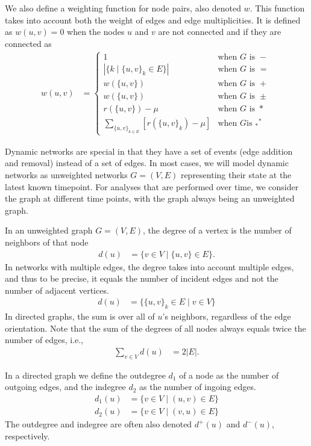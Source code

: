 \documentclass{article}
\begin{document}
We also define a weighting function for node pairs, also denoted
$w$. This function takes into account both the weight of edges and edge
multiplicities. It is defined as $w(u,v)=0$ when the nodes $u$ and $v$ are
not connected and if they are connected as
\begin{align}
  w(u,v) &= \left\{ \begin{array}{ll}
    1 & \text{when $G$ is $-$} \\
    |\{k \mid \{u,v\}_k \in E\}| & \text{when $G$ is $=$} \\
    w(\{u,v\}) & \text{when $G$ is $+$}
    \\
    w(\{u,v\}) & \text{when $G$ is $\pm$} \\
    r(\{u,v\}) - \mu & \text{when $G$ is $*$} \\
    \sum_{\{u,v\}_{k\in E}} [r(\{u,v\}_k) - \mu] & \text{when $G$
      is $_*{}^*$}
    \end{array} \right. 
\end{align}

Dynamic networks are special in that they have a set of events (edge
addition and removal) instead of a set of edges.  In most cases, we will
model dynamic networks as unweighted networks $G=(V,E)$ representing
their state at the latest known timepoint.  For analyses that are
performed over time, we consider the graph at different time points,
with the graph always being an unweighted graph. 

In an unweighted graph $G=(V,E)$, the degree of a vertex is the number
of neighbors of that node
\begin{align}
  d(u) &= \{ v \in V \mid \{u,v\} \in E \}. 
\end{align}
In networks with multiple edges, the degree takes into account multiple
edges, and thus to be precise, it equals the number of incident edges
and not the number of adjacent vertices. 
\begin{align}
  d(u) &= \{ \{u,v\}_k \in E \mid v \in V \}
\end{align}
In directed graphs, the sum is over all of $u$'s neighbors, regardless
of the edge orientation. 
Note that the sum of the degrees of all nodes always equals twice the
number of edges, i.e.,
\begin{align}
  \sum_{v\in V} d(u) &= 2|E|. 
\end{align}

In a directed graph we define the outdegree $d_1$ of a node as the number of
outgoing edges, and the indegree $d_2$ as the number of ingoing edges.
\begin{align}
  d_1(u) &= \{ v \in V \mid (u,v) \in E \} \\
  d_2(u) &= \{ v \in V \mid (v,u) \in E \}
\end{align}
The outdegree and indegree are often also denoted $d^+(u)$ and
$d^-(u)$, respectively. 
\end{document}
